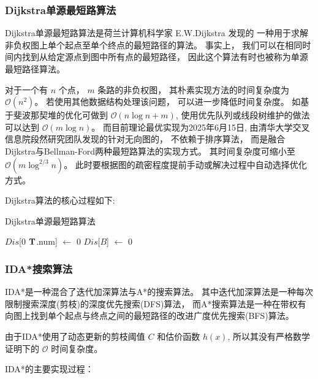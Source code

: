 \documentclass[12pt,a4paper,oneside,UTF8]{ctexart}
\begin{document}
\subsubsection{Dijkstra单源最短路算法}
Dijkstra单源最短路算法是荷兰计算机科学家 E.W.Dijkstra 发现的
一种用于求解非负权图上单个起点至单个终点的最短路径的算法。
事实上，
我们可以在相同时间内找到从给定源点到图中所有点的最短路径，
因此这个算法有时也被称为单源最短路径算法\textsuperscript{\cite{ref4}}。

对于一个有 $n$ 个点，
$m$ 条路的非负权图，
其朴素实现方法的时间复杂度为 $\mathcal{O}(n^2)$。
若使用其他数据结构处理该问题，
可以进一步降低时间复杂度。
如基于斐波那契堆的优化可做到 $\mathcal{O}(n \log n + m)$,
使用优先队列或线段树维护的做法可以达到 $\mathcal{O}(m \log n)$。
而目前理论最优实现为2025年6月15日,
由清华大学交叉信息院段然研究团队发现的针对无向图的，
不依赖于排序算法，
而是融合Dijkstra与Bellman-Ford两种最短路算法的实现方式。
其时间复杂度可缩小至 $\mathcal{O}(m \log ^{2/3} n)$\textsuperscript{\cite{ref5}}。
此时要根据图的疏密程度提前手动或解决过程中自动选择优化方式。

Dijkstra算法的核心过程如下:

\begin{algorithm}[H]
  \caption{Dijkstra单源最短路算法}\label{algorithm-traditional-Dijkstra}

  $Dis$[$0$ \KwTo $\bf{T}$.num] $\leftarrow$ 0\;
  $Dis$[$B$] $\leftarrow$ 0\;
\end{algorithm}

\subsubsection{IDA*搜索算法}
IDA*是一种混合了迭代加深算法与A*的搜索算法。
其中迭代加深算法是一种每次限制搜索深度(剪枝)的深度优先搜索(DFS)算法，
而A*搜索算法是一种在带权有向图上找到单个起点与终点之间的最短路径的改进广度优先搜索(BFS)算法。

由于IDA*使用了动态更新的剪枝阈值 $C$ 和估价函数 $h(x)$,
所以其没有严格数学证明下的 $\mathcal{O}$ 时间复杂度。

IDA*的主要实现过程：
\end{document}

